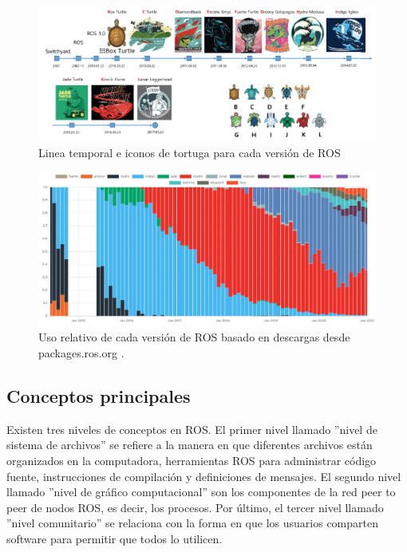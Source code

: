             \begin{figure}[htb]
            \centering
            \includegraphics[width=0.94\linewidth]{Main/Chapter3/Images3/ver_ros_1.png}
            \caption{Linea temporal e iconos de tortuga para cada versión de ROS \cite{ROS_BOOK_1}}
            \label{f:Cap3-5_estadisticas_10}
            \end{figure} 
    
            \begin{figure}[htb]
            \centering
            \includegraphics[width=0.94\linewidth]{Main/Chapter3/Images3/ver_ros_2.png}
            \caption{Uso relativo de cada versión de ROS basado en descargas desde packages.ros.org \cite{rosmetrics}.}            \label{f:Cap3-5_estadisticas_11}
            \end{figure} 
    
    \newpage
    
    \subsection{Conceptos principales}
            
            Existen tres niveles de conceptos en ROS. El primer nivel llamado ''nivel de sistema de archivos'' se refiere a la manera en que diferentes archivos están organizados en la computadora, herramientas ROS para administrar código fuente, instrucciones de compilación y definiciones de mensajes. El segundo nivel llamado ''nivel de gráfico computacional'' son los componentes de la red peer to peer de nodos ROS, es decir, los procesos. Por último, el tercer nivel llamado ''nivel comunitario'' se relaciona con la forma en que los usuarios comparten software para permitir que todos lo utilicen.
            

